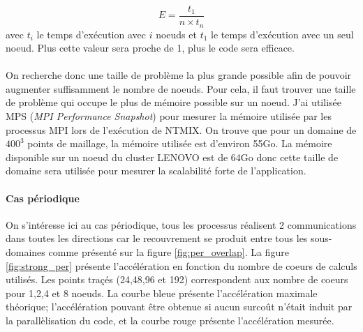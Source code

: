 $$E=\frac{t_1}{n\times t_n}$$ avec $t_i$ le temps d'exécution avec $i$ noeuds et $t_1$ le temps d'exécution avec un seul noeud. Plus cette valeur sera proche de 1, plus le code sera efficace.

\paragraph{}On recherche donc une taille de problème la plus grande possible afin de pouvoir augmenter suffisamment le nombre de noeuds. Pour cela, il faut trouver une taille de problème qui occupe le plus de mémoire possible sur un noeud. J'ai utilisée MPS (\textit{MPI Performance Snapshot}) pour mesurer la mémoire utilisée par les processus MPI lors de l'exécution de NTMIX. On trouve que pour un domaine de $400^3$ points de maillage, la mémoire utilisée est d'environ 55Go. La mémoire disponible sur un noeud du cluster LENOVO est de 64Go donc cette taille de domaine sera utilisée pour mesurer la scalabilité forte de l'application.



\paragraph{Cas périodique}
On s'intéresse ici au cas périodique, tous les processus réalisent 2 communications dans toutes les directions car le recouvrement se produit entre tous les sous-domaines comme présenté sur la figure \ref{fig:per_overlap}. La figure \ref{fig:strong_per} présente l'accélération en fonction du nombre de coeurs de calculs utilisés. Les points traçés (24,48,96 et 192) correspondent aux nombre de coeurs pour 1,2,4 et 8 noeuds. La courbe bleue présente l'accélération maximale théorique; l'accélération pouvant être obtenue si aucun surcoût n'était induit par la parallèlisation du code, et la courbe rouge présente l'accélération mesurée.


